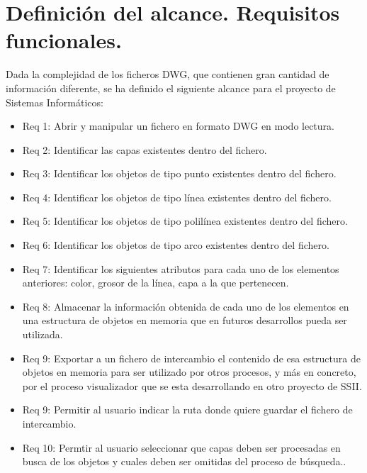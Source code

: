 \section{Definición del alcance. Requisitos funcionales.}

Dada la complejidad de los ficheros DWG, que contienen gran cantidad de información diferente, se ha definido el siguiente alcance para el proyecto de Sistemas Informáticos:


\begin{itemize}

\item{Req 1: Abrir y manipular un fichero en formato DWG en modo lectura.}
\item{Req 2: Identificar las capas existentes dentro del fichero.}
\item{Req 3: Identificar los objetos de tipo punto existentes dentro del fichero.}
\item{Req 4: Identificar los objetos de tipo línea existentes dentro del fichero.}
\item{Req 5: Identificar los objetos de tipo polilínea existentes dentro del fichero.}
\item{Req 6: Identificar los objetos de tipo arco existentes dentro del fichero.}
\item{Req 7: Identificar los siguientes atributos para cada uno de los elementos anteriores: color, grosor de la línea, capa a la que pertenecen}.
\item{Req 8: Almacenar la información obtenida de cada uno de los elementos en una estructura de objetos en memoria que en futuros desarrollos pueda ser utilizada}.
\item{Req 9: Exportar a un fichero de intercambio el contenido de esa estructura de objetos en memoria para ser utilizado por otros procesos, y más en concreto, por el proceso visualizador que se esta desarrollando en otro proyecto de SSII.}
\item{Req 9: Permitir al usuario indicar la ruta donde quiere guardar el fichero de intercambio}.
\item{Req 10: Permtir al usuario seleccionar que capas deben ser procesadas en busca de los objetos y cuales deben ser omitidas del proceso de búsqueda.}.

\end{itemize}
